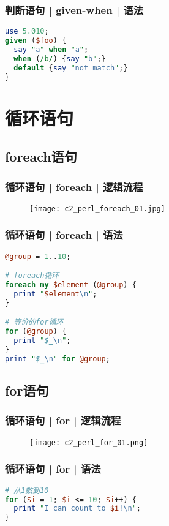 \begin{frame}[fragile]
  \frametitle{判断语句 | given-when | 语法}
\begin{lstlisting}[language=Perl]
use 5.010;
given ($foo) {
  say "a" when "a";
  when (/b/) {say "b";}
  default {say "not match";}
}
\end{lstlisting}
\end{frame}

\section{循环语句}
\subsection{foreach语句}
\begin{frame}
  \frametitle{循环语句 | foreach | 逻辑流程}
  \begin{figure}
    \centering
    \texttt{[image: c2\_perl\_foreach\_01.jpg]}
  \end{figure}
\end{frame}

\begin{frame}[fragile]
  \frametitle{循环语句 | foreach | \alert{语法}}
  \vspace{-1.5em}
\begin{lstlisting}[language=Perl]
@group = 1..10;

# foreach循环
foreach my $element (@group) {
  print "$element\n";
}

# 等价的for循环
for (@group) {
  print "$_\n";
}
print "$_\n" for @group;
\end{lstlisting}
\end{frame}

\subsection{for语句}
\begin{frame}
  \frametitle{循环语句 | for | 逻辑流程}
  \begin{figure}
    \centering
    \texttt{[image: c2\_perl\_for\_01.png]}
  \end{figure}
\end{frame}

\begin{frame}[fragile]
  \frametitle{循环语句 | for | \alert{语法}}
\begin{lstlisting}[language=Perl]
# 从1数到10
for ($i = 1; $i <= 10; $i++) {
  print "I can count to $i!\n";
}
\end{lstlisting}
\end{frame}

